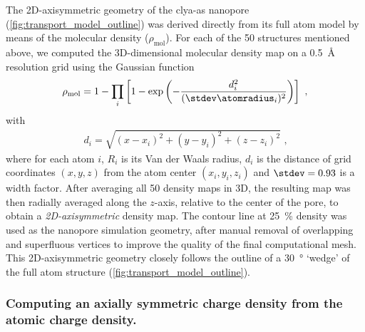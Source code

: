 The 2D-axisymmetric geometry of the \gls{clya-as} nanopore (\cref{fig:transport_model_outline}) was derived
directly from its full atom model by means of the molecular density ($\rho_\text{mol}$). For each of the 50
structures mentioned above, we computed the 3D-dimensional molecular density map on a \SI{0.5}{\angstrom}
resolution grid using the Gaussian function~\cite{Li-2013}
%
\begin{align}\label{eq:denspore}
  \rho_\text{mol} = 1 - \displaystyle\prod_{i} \left[ 1 - 
    \exp{\left(-\dfrac{d_i^2}{(\stdev\atomradius_{i})^2}\right)} \right]
    \text{ ,}
\end{align}
%
with
%
\begin{align}
  d_i = \sqrt{(x-x_i)^2 + (y-y_i)^2 + (z-z_i)^2}
  \text{ ,}
\end{align}
%
where for each atom $i$, $R_i$ is its Van der Waals radius, $d_i$ is the distance of grid coordinates $(x, y,
z)$ from the atom center $(x_i, y_i, z_i)$ and $\stdev = 0.93$ is a width factor. After averaging all 50
density maps in 3D, the resulting map was then radially averaged along the $z$-axis, relative to the center of
the pore, to obtain a \emph{2D-axisymmetric} density map. The contour line at \SI{25}{\percent} density was
used as the nanopore simulation geometry, after manual removal of overlapping and superfluous vertices to
improve the quality of the final computational mesh. This 2D-axisymmetric geometry closely follows the outline
of a \SI{30}{\degree} `wedge' of the full atom structure (\cref{fig:transport_model_outline}).

\subsubsection{Computing an axially symmetric charge density from the atomic charge density.}
%

